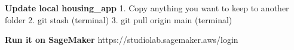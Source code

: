 \textbf{Update local housing_app}
1. Copy anything you want to keep to another folder
2. git stash (terminal)
3. git pull origin main (terminal)


\textbf{Run it on SageMaker}
https://studiolab.sagemaker.aws/login

